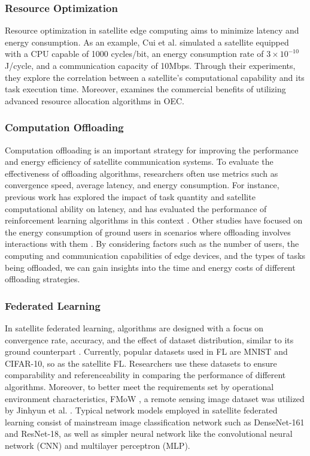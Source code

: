 \documentclass[lettersize,journal]{IEEEtran}
\begin{document}
\subsubsection*{Resource Optimization}
Resource optimization in satellite edge computing aims to minimize latency and energy consumption. As an example, Cui et al. \cite{RN78} simulated a satellite equipped with a CPU capable of 1000 cycles/bit, an energy consumption rate of $3\times 10^{-10}$ J/cycle, and a communication capacity of 10Mbps. Through their experiments, they explore the correlation between a satellite's computational capability and its task execution time. Moreover, \cite{RN80} examines the commercial benefits of utilizing advanced resource allocation algorithms in OEC.

\subsubsection*{Computation Offloading}
Computation offloading is an important strategy for improving the performance and energy efficiency of satellite communication systems. To evaluate the effectiveness of offloading algorithms, researchers often use metrics such as convergence speed, average latency, and energy consumption. For instance, previous work has explored the impact of task quantity and satellite computational ability on latency, and has evaluated the performance of reinforcement learning algorithms in this context \cite{RN18,RN81,RN79}. Other studies have focused on the energy consumption of ground users in scenarios where offloading involves interactions with them \cite{RN77}. By considering factors such as the number of users, the computing and communication capabilities of edge devices, and the types of tasks being offloaded, we can gain insights into the time and energy costs of different offloading strategies.

\subsubsection*{Federated Learning}
In satellite federated learning, algorithms are designed with a focus on convergence rate, accuracy, and the effect of dataset distribution, similar to its ground counterpart \cite{RN211}. Currently, popular datasets used in FL are MNIST and CIFAR-10, so as the satellite FL. Researchers use these datasets to ensure comparability and referenceability in comparing the performance of different algorithms. Moreover, to better meet the requirements set by operational environment characteristics, FMoW \cite{FMOW}, a remote sensing image dataset was utilized by Jinhyun et al. \cite{RN211}. Typical network models employed in satellite federated learning consist of mainstream image classification network such as DenseNet-161 and ResNet-18, as well as simpler neural network like the convolutional neural network (CNN) and multilayer perceptron (MLP).
\end{document}
